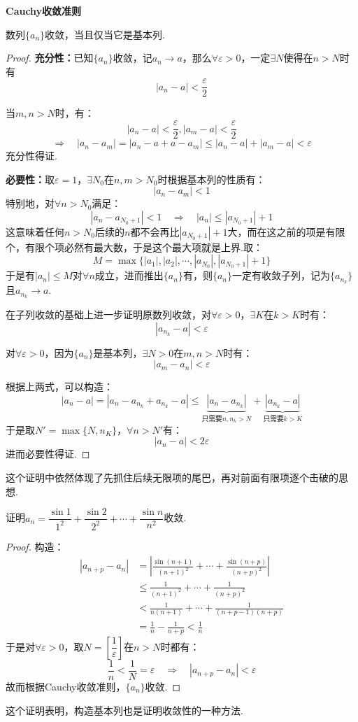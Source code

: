 \begin{theorem}
    \textbf{Cauchy收敛准则}

    数列$\{a_n\}$收敛，当且仅当它是基本列.
\end{theorem}

\begin{proof}
    \textbf{充分性：}已知$\{a_n\}$收敛，记$a_n \to a$，那么$\forall \varepsilon > 0$，一定$\exists N$使得在$n>N$时有
    \[|a_n - a| < \dfrac{\varepsilon}{2}\]

    当$m,n > N$时，有：
    \[|a_n - a| < \frac{\varepsilon}{2}, |a_m -a| < \frac{\varepsilon}{2}\]
    \[\Rightarrow\quad |a_n-a_m| = |a_n - a + a - a_m| \leqslant |a_n - a| + |a_m - a| < \varepsilon\]
    充分性得证.

    \textbf{必要性：}取$\varepsilon = 1$，$\exists N_0$在$n,m>N_0$时根据基本列的性质有：
    \[|a_n - a_m| < 1\]
    特别地，对$\forall n > N_0$满足：
    \[|a_n - a_{N_0+1}| < 1 \quad\Rightarrow\quad |a_n| \leqslant |a_{N_0+1}|+1\]
    这意味着任何$n>N_0$后续的$n$都不会再比$|a_{N_0+1}|+1$大，而在这之前的项是有限个，有限个项必然有最大数，于是这个最大项就是上界.取：
    \[M = \max\{|a_1|, |a_2|, \cdots, |a_{N_0}|, |a_{N_0+1}|+1\}\]
    于是有$|a_n| \leqslant M$对$\forall n$成立，进而推出$\{a_n\}$有，则$\{a_n\}$一定有收敛子列，记为$\{a_{n_k}\}$且$a_{n_k} \to a$.

    在子列收敛的基础上进一步证明原数列收敛，对$\forall \varepsilon>0$，$\exists K$在$k>K$时有：
    \[|a_{n_k} - a| < \varepsilon\]
    
    对$\forall \varepsilon > 0$，因为$\{a_n\}$是基本列，$\exists N>0$在$m,n>N$时有：
    \[|a_m - a_n|<\varepsilon\]

    根据上两式，可以构造：
    \[|a_n - a| = |a_n - a_{n_k} + a_{n_k} - a| \leqslant \underbrace{|a_n - a_{n_k}|}_\text{只需要$n,n_k>N$} + \underbrace{|a_{n_k} - a|}_\text{只需要$k>K$}\]
    于是取$N' = \max\{N, n_K\}$，$\forall n>N'$有：
    \[|a_n - a|<2\varepsilon\]
    进而必要性得证.
\end{proof}
这个证明中依然体现了先抓住后续无限项的尾巴，再对前面有限项逐个击破的思想.

\begin{question}
    证明$a_n = \dfrac{\sin 1}{1^2} + \dfrac{\sin 2}{2^2} + \cdots + \dfrac{\sin n}{n^2}$收敛.
\end{question}

\begin{proof}
    构造：
    \begin{align*}
        |a_{n+p} - a_n| &= \left|\frac{\sin(n+1)}{(n+1)^2} + \cdots + \frac{\sin(n+p)}{(n+p)^2}\right| \\
        &\leqslant \frac{1}{(n+1)^2} + \cdots + \frac{1}{(n+p)^2} \\
        &< \frac{1}{n(n+1)} + \cdots + \frac{1}{(n+p-1)(n+p)} \\
        &= \frac{1}{n} - \frac{1}{n+p} < \frac{1}{n}
    \end{align*}
    于是对$\forall \varepsilon > 0$，取$N = \left[\dfrac{1}{\varepsilon}\right]$在$n>N$时都有：
    \[\frac{1}{n}<\frac{1}{N} = \varepsilon \quad\Rightarrow\quad |a_{n+p} - a_n| < \varepsilon\]
    故而根据Cauchy收敛准则，$\{a_n\}$收敛.
\end{proof}
这个证明表明，构造基本列也是证明收敛性的一种方法.


